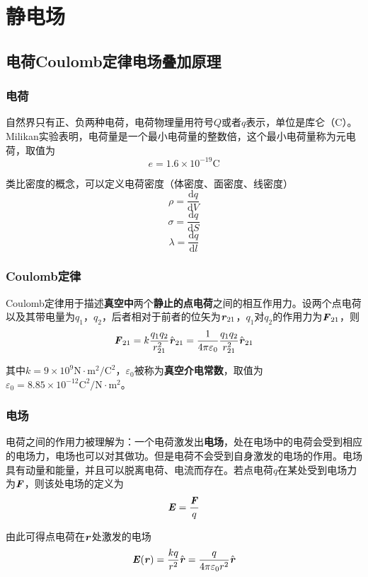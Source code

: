 \documentclass[UTF8,openany]{book}
\begin{document}
	\chapter{静电场}
	\section{电荷\quad Coulomb定律\quad 电场\quad 叠加原理}
	\subsection{电荷}
	自然界只有正、负两种电荷，电荷物理量用符号$Q$或者$q$表示，单位是库仑（C）。Milikan实验表明，电荷量是一个最小电荷量的整数倍，这个最小电荷量称为元电荷，取值为
	$$e=1.6\times 10^{-19}\mathrm{C}$$\par
	类比密度的概念，可以定义电荷密度（体密度、面密度、线密度）
	$$\rho=\frac{\mathrm{d}q}{\mathrm{d}V}$$
	$$\sigma=\frac{\mathrm{d}q}{\mathrm{d}S}$$
	$$\lambda=\frac{\mathrm{d}q}{\mathrm{d}l}$$
	\subsection{Coulomb定律}
	Coulomb定律用于描述\textbf{真空中}两个\textbf{静止的}\textbf{点电荷}之间的相互作用力。设两个点电荷以及其带电量为$q_1$，$q_2$，后者相对于前者的位矢为$\textbf{\textit{r}}_{21}$，$q_1$对$q_2$的作用力为$\textbf{\textit{F}}_{21}$，则
	$$\textbf{\textit{F}}_{21}=k\frac{q_1q_2}{r_{21}^{2}}\hat{\textbf{\textit{r}}}_{21}=
	\frac{1}{4\pi\varepsilon_{0}}\frac{q_1q_2}{r_{21}^{2}}\hat{\textbf{\textit{r}}}_{21}$$\par
	其中$k=9\times 10^9\mathrm{N\cdot m^2/C^2}$，$\varepsilon_{0}$被称为\textbf{真空介电常数}，取值为$\varepsilon_0=8.85\times 10^{-12}\mathrm{C^2/N\cdot m^2}$。
	\subsection{电场}
	电荷之间的作用力被理解为：一个电荷激发出\textbf{电场}，处在电场中的电荷会受到相应的电场力，电场也可以对其做功。但是电荷不会受到自身激发的电场的作用。电场具有动量和能量，并且可以脱离电荷、电流而存在。若点电荷$q$在某处受到电场力为$\textbf{\textit{F}}$，则该处电场的定义为
	$$\textbf{\textit{E}}=\frac{\textbf{\textit{F}}}{q}$$\par
	由此可得点电荷在$\textbf{\textit{r}}$处激发的电场
	$$\textbf{\textit{E}}(\textbf{\textit{r}})=\frac{kq}{r^2}\hat{\textbf{\textit{r}}}=\frac{q}{4\pi\varepsilon_0r^2}\hat{\textbf{\textit{r}}}$$
\end{document}
